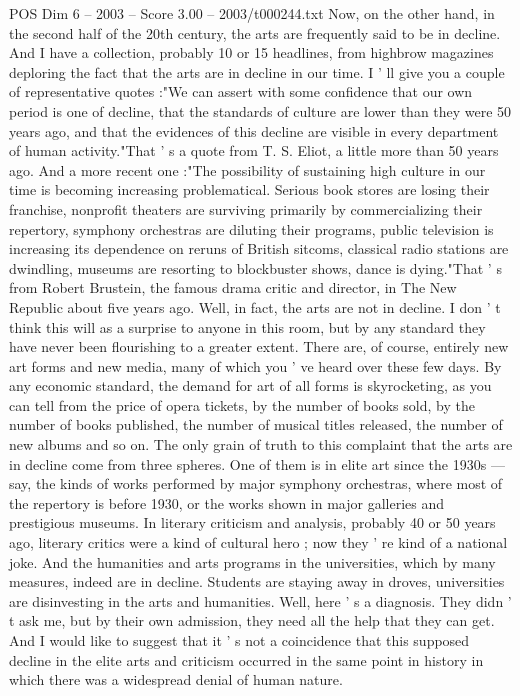 \begin{textsample}{POS Dim 6 – 2003 – Score 3.00 – 2003/t000244.txt}
Now, on the other hand, in the second half of the 20th century, the arts are frequently said to be in decline.
And I have a collection, probably 10 or 15 headlines, from highbrow magazines deploring the fact that the arts are in decline in our time.
I ' ll give you a couple of representative quotes :"We can assert with some confidence that our own period is one of decline, that the standards of culture are lower than they were 50 years ago, and that the evidences of this decline are visible in every department of human activity."That ' s a quote from T.
S.
Eliot, a little more than 50 years ago.
And a more recent one :"The possibility of sustaining high culture in our time is becoming increasing problematical.
Serious book stores are losing their franchise, nonprofit theaters are surviving primarily by commercializing their repertory, symphony orchestras are diluting their programs, public television is increasing its dependence on reruns of British sitcoms, classical radio stations are dwindling, museums are resorting to blockbuster shows, dance is dying."That ' s from Robert Brustein, the famous drama critic and director, in The New Republic about five years ago.
Well, in fact, the arts are not in decline.
I don ' t think this will as a surprise to anyone in this room, but by any standard they have never been flourishing to a greater extent.
There are, of course, entirely new art forms and new media, many of which you ' ve heard over these few days.
By any economic standard, the demand for art of all forms is skyrocketing, as you can tell from the price of opera tickets, by the number of books sold, by the number of books published, the number of musical titles released, the number of new albums and so on.
The only grain of truth to this complaint that the arts are in decline come from three spheres.
One of them is in elite art since the 1930s — say, the kinds of works performed by major symphony orchestras, where most of the repertory is before 1930, or the works shown in major galleries and prestigious museums.
In literary criticism and analysis, probably 40 or 50 years ago, literary critics were a kind of cultural hero ; now they ' re kind of a national joke.
And the humanities and arts programs in the universities, which by many measures, indeed are in decline.
Students are staying away in droves, universities are disinvesting in the arts and humanities.
Well, here ' s a diagnosis.
They didn ' t ask me, but by their own admission, they need all the help that they can get.
And I would like to suggest that it ' s not a coincidence that this supposed decline in the elite arts and criticism occurred in the same point in history in which there was a widespread denial of human nature.

\end{textsample}

